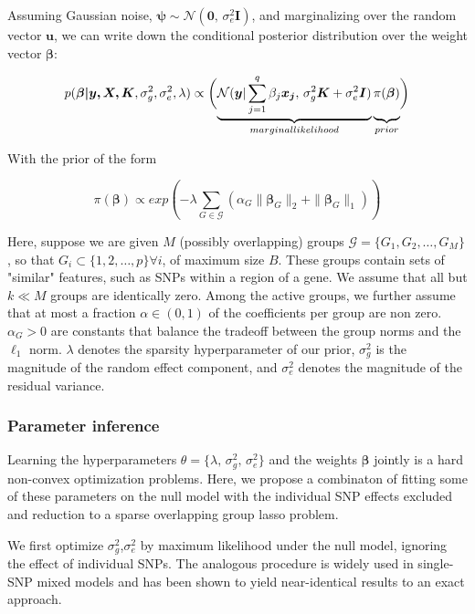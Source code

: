 \documentclass[11pt]{article}
\theoremstyle{plain}
\theoremstyle{definition}
\theoremstyle{remark}
\begin{document}
Assuming Gaussian noise, $\bm\psi\sim\mathcal{N}(\bm{0},\,\sigma_e^2\bm{I})$, and marginalizing over the random vector $\bm{u}$, we can write down the conditional posterior distribution over the weight vector $\bm\beta$:

\begin{equation}
\label{eq:2}
p(\bm{\beta|y,X,K},\sigma_g^2,\sigma_e^2,\lambda)\propto
\biggl(
\underbrace{\mathcal{N}(\bm{y}|\sum_{j=1}^q\beta_j\bm{x_j},\,\sigma_g^2\bm{K}+\sigma_e^2\bm{I})}_{marginal likelihood}
\underbrace{\vphantom{\sum_{j=1}^q}\pi(\bm{\beta})}_{prior}
\biggr)
\end{equation}

With the prior of the form

\begin{equation}
\label{eq:3}
\pi(\bm{\beta})\propto exp(-\lambda\sum_{G\in\mathcal{G}}(\alpha_{G}\parallel\bm\beta_G\parallel_2+\parallel\bm\beta_G\parallel_1))
\end{equation}

Here, suppose we are given $M$ (possibly overlapping) groups $\mathcal{G}=\{G_1,G_2,\ldots,G_M\}$, so that $G_i\subset \{1,2,\ldots,p\}\forall i$, of maximum size $B$. These groups contain sets of "similar" features, such as SNPs within a region of a gene. We assume that all but $k\ll M$ groups are identically zero. Among the active groups, we further assume that at most a fraction $\alpha \in (0,1)$ of the coefficients per group are non zero. $\alpha_G>0$ are constants that balance the tradeoff between the group norms and the $\ell_1$ norm. $\lambda$ denotes the sparsity hyperparameter of our prior, $\sigma_g^2$ is the magnitude of the random effect component, and $\sigma_e^2$ denotes the magnitude of the residual variance.

\subsubsection{Parameter inference}
Learning the hyperparameters $\mathcal{\theta}=\{\lambda,\,\sigma_g^2,\,\sigma_e^2\}$ and the weights $\bm\beta$ jointly is a hard non-convex optimization problems. Here, we propose a combinaton of fitting some of these parameters on the null model with the individual SNP effects excluded and reduction to a sparse overlapping group lasso problem.

We first optimize $\sigma_g^2$,$\sigma_e^2$ by maximum likelihood under the null model, ignoring the effect of individual SNPs. The analogous procedure is widely used in single-SNP mixed models and has been shown to yield near-identical results to an exact approach.
\end{document}
